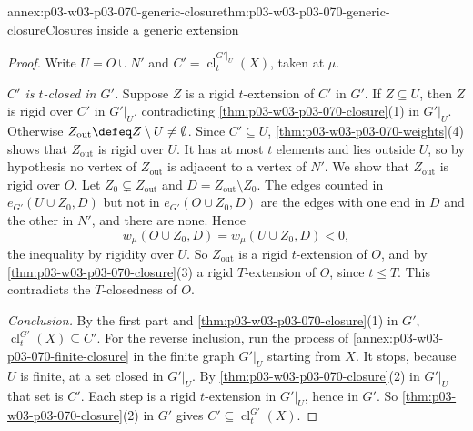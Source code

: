 \begin{annexitem}{annex:p03-w03-p03-070-generic-closure}{thm:p03-w03-p03-070-generic-closure}{Closures inside a generic extension}
\begin{proof}
Write \(U=O\cup N'\) and \(C'=\operatorname{cl}^{G'|_U}_t(X)\), taken at
\(\mu\).

\emph{\(C'\) is \(t\)-closed in \(G'\).}  Suppose \(Z\) is a rigid
\(t\)-extension of \(C'\) in \(G'\).  If \(Z\subseteq U\), then \(Z\) is
rigid over \(C'\) in \(G'|_U\), contradicting
\cref{thm:p03-w03-p03-070-closure}(1) in \(G'|_U\).  Otherwise
\(Z_{\mathrm{out}}\defeq Z\setminus U\neq\emptyset\).  Since \(C'\subseteq U\),
\cref{thm:p03-w03-p03-070-weights}(4) shows that \(Z_{\mathrm{out}}\) is rigid
over \(U\).  It has at most \(t\) elements and lies outside \(U\), so by
hypothesis no vertex of \(Z_{\mathrm{out}}\) is adjacent to a vertex of \(N'\).
We show that \(Z_{\mathrm{out}}\) is rigid over \(O\).  Let
\(Z_0\subsetneq Z_{\mathrm{out}}\) and \(D=Z_{\mathrm{out}}\setminus Z_0\).  The
edges counted in \(e_{G'}(U\cup Z_0,D)\) but not in \(e_{G'}(O\cup Z_0,D)\) are
the edges with one end in \(D\) and the other in \(N'\), and there are none.
Hence
\[
 w_\mu(O\cup Z_0,D)=w_\mu(U\cup Z_0,D)<0 ,
\]
the inequality by rigidity over \(U\).  So \(Z_{\mathrm{out}}\) is a rigid
\(t\)-extension of \(O\), and by \cref{thm:p03-w03-p03-070-closure}(3) a rigid
\(T\)-extension of \(O\), since \(t\leq T\).  This contradicts the
\(T\)-closedness of \(O\).

\emph{Conclusion.}  By the first part and
\cref{thm:p03-w03-p03-070-closure}(1) in \(G'\),
\(\operatorname{cl}^{G'}_t(X)\subseteq C'\).  For the reverse inclusion, run the
process of \cref{annex:p03-w03-p03-070-finite-closure} in the finite graph
\(G'|_U\) starting from \(X\).  It stops, because \(U\) is finite, at a set
closed in \(G'|_U\).  By \cref{thm:p03-w03-p03-070-closure}(2) in \(G'|_U\)
that set is \(C'\).  Each step is a rigid \(t\)-extension in \(G'|_U\), hence
in \(G'\).  So \cref{thm:p03-w03-p03-070-closure}(2) in \(G'\) gives
\(C'\subseteq\operatorname{cl}^{G'}_t(X)\).
\end{proof}
\end{annexitem}

